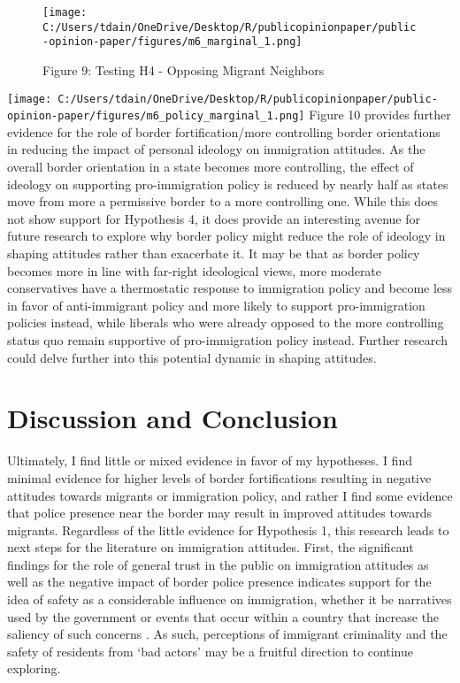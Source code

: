 \documentclass[12pt,]{article}
\begin{document}
\begin{figure}
\centering
\texttt{[image: C:/Users/tdain/OneDrive/Desktop/R/publicopinionpaper/public-opinion-paper/figures/m6\_marginal\_1.png]}
\caption{Figure 9: Testing H4 - Opposing Migrant Neighbors}
\end{figure}

\texttt{[image: C:/Users/tdain/OneDrive/Desktop/R/publicopinionpaper/public-opinion-paper/figures/m6\_policy\_marginal\_1.png]}
Figure 10 provides further evidence for the role of border
fortification/more controlling border orientations in reducing the
impact of personal ideology on immigration attitudes. As the overall
border orientation in a state becomes more controlling, the effect of
ideology on supporting pro-immigration policy is reduced by nearly half
as states move from more a permissive border to a more controlling one.
While this does not show support for Hypothesis 4, it does provide an
interesting avenue for future research to explore why border policy
might reduce the role of ideology in shaping attitudes rather than
exacerbate it. It may be that as border policy becomes more in line with
far-right ideological views, more moderate conservatives have a
thermostatic response to immigration policy and become less in favor of
anti-immigrant policy and more likely to support pro-immigration
policies instead, while liberals who were already opposed to the more
controlling status quo remain supportive of pro-immigration policy
instead. Further research could delve further into this potential
dynamic in shaping attitudes.

\section{Discussion and Conclusion}\label{discussion-and-conclusion}

Ultimately, I find little or mixed evidence in favor of my hypotheses. I
find minimal evidence for higher levels of border fortifications
resulting in negative attitudes towards migrants or immigration policy,
and rather I find some evidence that police presence near the border may
result in improved attitudes towards migrants. Regardless of the little
evidence for Hypothesis 1, this research leads to next steps for the
literature on immigration attitudes. First, the significant findings for
the role of general trust in the public on immigration attitudes as well
as the negative impact of border police presence indicates support for
the idea of safety as a considerable influence on immigration, whether
it be narratives used by the government \citep{bajomi-lazar2019} or
events that occur within a country that increase the saliency of such
concerns \citep{young2018}. As such, perceptions of immigrant
criminality and the safety of residents from `bad actors' may be a
fruitful direction to continue exploring.
\end{document}
